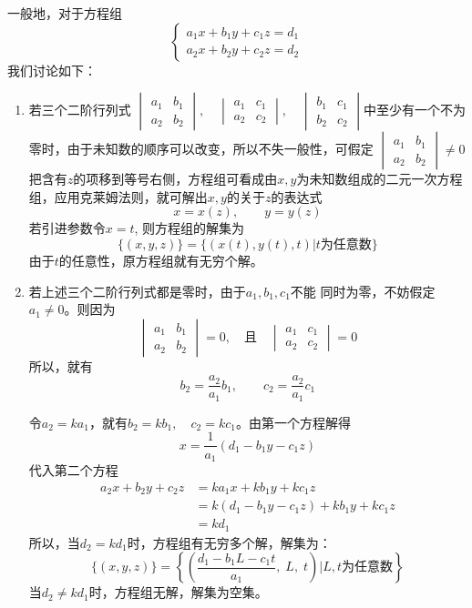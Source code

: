 一般地，对于方程组
\[\begin{cases}
    a_1x+b_1y+c_1z=d_1\\
    a_2x+b_2y+c_2z=d_2
\end{cases}\]
我们讨论如下：

\begin{enumerate}
    \item 若三个二阶行列式
$\begin{vmatrix}
    a_1&b_1\\a_2&b_2
\end{vmatrix},\quad \begin{vmatrix}
    a_1&c_1\\a_2&c_2
\end{vmatrix},\quad \begin{vmatrix}
    b_1&c_1\\b_2&c_2
\end{vmatrix}$中至少有一个不为零时，由于未知数的顺序可以改变，所以不失一般性，可假定
$\begin{vmatrix}
    a_1&b_1\\a_2&b_2
\end{vmatrix}\ne 0$
把含有$z$的项移到等号右侧，方程组可看成由$x,y$为未知数组成的二元一次方程组，应用克莱姆法则，就可解出$x,y$的关于$z$的表达式
\[x=x (z) ,\qquad y=y (z) \]
若引进参数令$x=t$, 则方程组的解集为
\[\{(x,y,z)\} =\{(x(t),y(t),t)|\text{$t$为任意数}\}\]
由于$t$的任意性，原方程组就有无穷个解。
\item  若上述三个二阶行列式都是零时，由于$a_1,b_1,c_1$不能
同时为零，不妨假定$a_1\ne 0$。则因为
\[\begin{vmatrix}
    a_1&b_1\\a_2&b_2
\end{vmatrix}=0,\quad \text{且}\quad \begin{vmatrix}
    a_1&c_1\\a_2&c_2
\end{vmatrix}=0\]
所以，就有
\[b_2=\frac{a_2}{a_1}b_1,\qquad c_2=\frac{a_2}{a_1}c_1\]

令$a_2=ka_1$，就有$b_2=kb_1,\quad c_2=kc_1$。由第一个方程解得
\[x=\frac{1}{a_1}(d_1-b_1y-c_1z)\]
代入第二个方程
\[\begin{split}
    a_2x+b_2y+c_2z&=ka_1x+kb_1y+kc_1z\\
    &=k(d_1-b_1y-c_1z)+kb_1y+kc_1z\\
    &=kd_1
\end{split}\]
所以，当$d_2=kd_1$时，方程组有无穷多个解，解集为：
\[\{(x,y,z)\}=\left\{\left(\frac{d_1-b_1L-c_1t}{a_1},\;L,\;t\right)\big|\text{$L,t$为任意数}\right\}\]
当$d_2\ne kd_1$时，方程组无解，解集为空集。
\end{enumerate}
    

